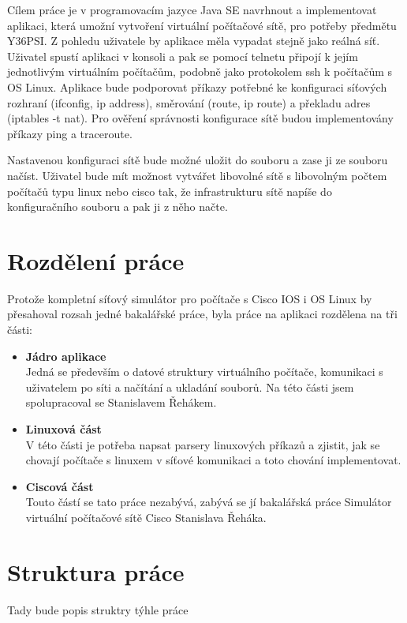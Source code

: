 Cílem práce je v programovacím jazyce Java SE navrhnout a implementovat aplikaci, která umožní vytvoření virtuální počítačové sítě, pro potřeby předmětu Y36PSI. Z pohledu uživatele by aplikace měla vypadat stejně jako reálná síť. Uživatel spustí aplikaci v konsoli a pak se pomocí telnetu připojí k jejím jednotlivým virtuálním počítačům, podobně jako protokolem ssh k počítačům s OS Linux. Aplikace bude podporovat příkazy potřebné ke konfiguraci síťových rozhraní (ifconfig, ip address), směrování (route, ip route) a překladu adres (iptables -t nat). Pro ověření správnosti konfigurace sítě budou implementovány příkazy ping a traceroute.

Nastavenou konfiguraci sítě bude možné uložit do souboru a zase ji ze souboru načíst. Uživatel bude mít možnost vytvářet libovolné sítě s libovolným počtem počítačů typu linux nebo cisco tak, že infrastrukturu sítě napíše do konfiguračního souboru a pak ji z něho načte.


\section{Rozdělení práce}

Protože kompletní síťový simulátor pro počítače s Cisco IOS i OS Linux by přesahoval rozsah jedné bakalářské práce, byla práce na aplikaci rozdělena na tři části:
\begin{itemize}
 \item \textbf{Jádro aplikace}\\ 
Jedná se především o datové struktury virtuálního počítače, komunikaci s uživatelem po síti a načítání a ukladání souborů. Na této části jsem spolupracoval se Stanislavem Řehákem.
 \item \textbf{Linuxová část}\\
V této části je potřeba napsat parsery linuxových příkazů a  zjistit, jak se chovají počítače s linuxem v síťové komunikaci a toto chování implementovat.
 \item \textbf{Ciscová část}\\
Touto částí se tato práce nezabývá, zabývá se jí bakalářská práce Simulátor virtuální počítačové sítě Cisco Stanislava Řeháka.
\end{itemize}


\section{Struktura práce}

Tady bude popis struktry týhle práce



